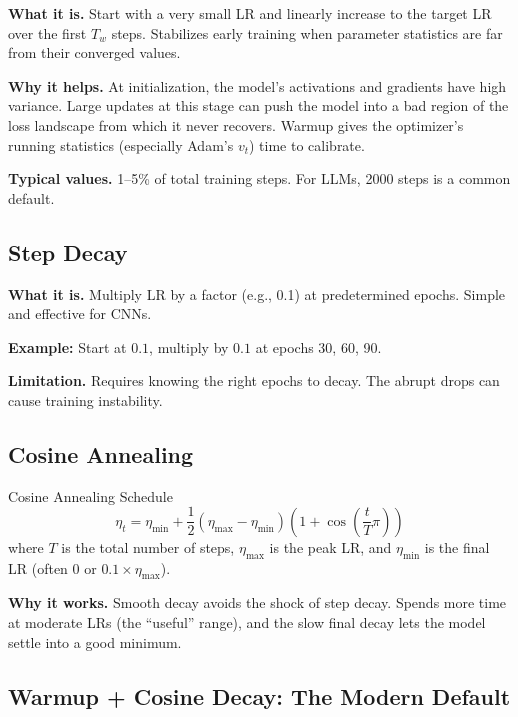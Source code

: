 \textbf{What it is.} Start with a very small LR and linearly increase to the target LR over the first $T_w$ steps. Stabilizes early training when parameter statistics are far from their converged values.

\textbf{Why it helps.} At initialization, the model's activations and gradients have high variance. Large updates at this stage can push the model into a bad region of the loss landscape from which it never recovers. Warmup gives the optimizer's running statistics (especially Adam's $v_t$) time to calibrate.

\textbf{Typical values.} 1--5\% of total training steps. For LLMs, 2000 steps is a common default.

\subsection{Step Decay}

\textbf{What it is.} Multiply LR by a factor (e.g., 0.1) at predetermined epochs. Simple and effective for CNNs.

\textbf{Example:} Start at $0.1$, multiply by $0.1$ at epochs 30, 60, 90.

\textbf{Limitation.} Requires knowing the right epochs to decay. The abrupt drops can cause training instability.

\subsection{Cosine Annealing}

\begin{mathresult}{Cosine Annealing Schedule}
\begin{equation}
\eta_t = \eta_{\min} + \frac{1}{2}(\eta_{\max} - \eta_{\min})\left(1 + \cos\left(\frac{t}{T}\pi\right)\right)
\end{equation}
where $T$ is the total number of steps, $\eta_{\max}$ is the peak LR, and $\eta_{\min}$ is the final LR (often $0$ or $0.1 \times \eta_{\max}$).
\end{mathresult}

\textbf{Why it works.} Smooth decay avoids the shock of step decay. Spends more time at moderate LRs (the ``useful'' range), and the slow final decay lets the model settle into a good minimum.

\subsection{Warmup + Cosine Decay: The Modern Default}

